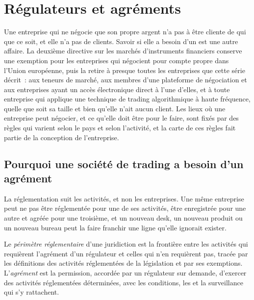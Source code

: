 \chapter{Régulateurs et agréments}\label{ch:fm:regulators-and-licences}

Une entreprise qui ne négocie que son propre argent n'a pas à être cliente de qui que ce soit, et elle n'a pas de clients. Savoir si elle a besoin d'un  est une
autre affaire. La deuxième directive sur les marchés d'instruments financiers conserve une exemption pour les entreprises qui négocient pour compte propre dans l'Union européenne,
puis la retire à presque toutes les entreprises que cette série décrit~: aux teneurs de marché, aux membres d'une plateforme de négociation et aux entreprises ayant un accès électronique direct
à l'une d'elles, et à toute entreprise qui applique une technique de trading algorithmique à haute fréquence, quelle que soit sa taille et bien qu'elle
n'ait aucun client. Les lieux où une entreprise peut négocier, et ce qu'elle doit être pour le faire, sont fixés par des règles qui varient selon le pays et selon l'activité, et la carte de
ces règles fait partie de la conception de l'entreprise.

\section{Pourquoi une société de trading a besoin d'un agrément}

La réglementation suit les activités, et non les entreprises. Une même entreprise peut ne pas être réglementée pour une de ses activités, être enregistrée pour une autre et agréée pour une troisième,
et un nouveau desk, un nouveau produit ou un nouveau bureau peut la faire franchir une ligne qu'elle ignorait exister.

\begin{definition}\label{def:fm:regulators-and-licences:perimeter}
Le \emph{périmètre réglementaire} d'une juridiction est la frontière entre les activités qui requièrent l'agrément
d'un régulateur et celles qui n'en requièrent pas, tracée par les définitions des activités réglementées de la législation et par ses exemptions. L'\emph{agrément}
est la permission, accordée par un régulateur sur demande, d'exercer des activités réglementées déterminées, avec les conditions, les  et
la surveillance qui s'y rattachent.
\end{definition}

